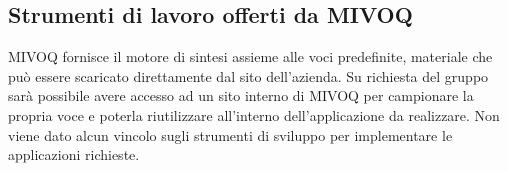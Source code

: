 \subsection{Strumenti di lavoro offerti da MIVOQ}
MIVOQ fornisce il motore di sintesi assieme alle voci predefinite, materiale che può essere scaricato direttamente dal sito dell’azienda. Su richiesta del gruppo sarà possibile avere accesso ad un sito interno di MIVOQ per campionare la propria voce e poterla riutilizzare all'interno dell’applicazione da realizzare. Non viene dato alcun vincolo sugli strumenti di sviluppo per implementare le applicazioni richieste.

